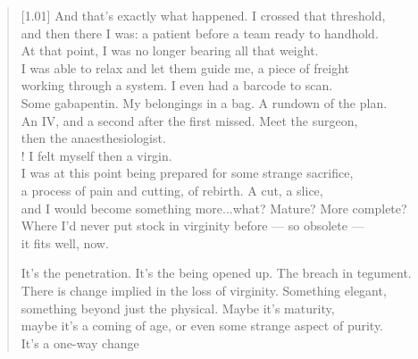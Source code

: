 \begin{verse}[1.01\textwidth]
  And that's exactly what happened. I crossed that threshold,\\
  and then there I was: a patient before a team ready to handhold.\\
  At that point, I was no longer bearing all that weight.\\
  I was able to relax and let them guide me, a piece of freight\\
  working through a system. I even had a barcode to scan.\\
  Some gabapentin. My belongings in a bag. A rundown of the plan.\\
  An IV, and a second after the first missed. Meet the surgeon,\\
  then the anaesthesiologist.\\!
   I felt myself then a virgin.\\
  I was at this point being prepared for some strange sacrifice,\\
  a process of pain and cutting, of rebirth. A cut, a slice,\\
  and I would become something more...what? Mature? More complete?\\
  Where I'd never put stock in virginity before --- so obsolete ---\\
  it fits well, now.

  \begin{ally}
    \noindent It's the penetration. It's the being opened up. The breach in tegument.\\
  \noindent There is change implied in the loss of virginity. Something elegant,\\
  \noindent something beyond just the physical. Maybe it's maturity,\\
  \noindent maybe it's a coming of age, or even some strange aspect of purity.\\
  \noindent It's a one-way change
\end{ally}


\end{verse}
